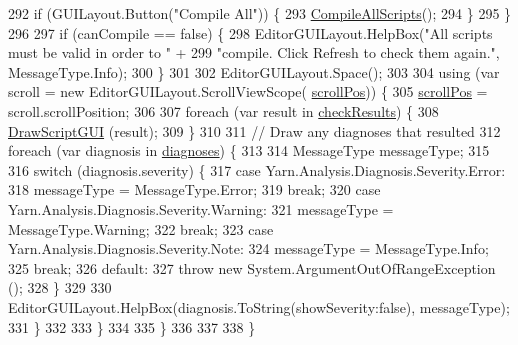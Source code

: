 \begin{DoxyCode}
292                     \textcolor{keywordflow}{if} (GUILayout.Button(\textcolor{stringliteral}{"Compile All"})) \{
293                         \hyperlink{a00188_ab84b77da285227c4ab4e1366131dd2b5}{CompileAllScripts}();
294                     \}
295                 \}
296 
297                 \textcolor{keywordflow}{if} (canCompile == \textcolor{keyword}{false}) \{
298                     EditorGUILayout.HelpBox(\textcolor{stringliteral}{"All scripts must be valid in order to "} +
299                         \textcolor{stringliteral}{"compile. Click Refresh to check them again."}, MessageType.Info);
300                 \}
301 
302                 EditorGUILayout.Space();
303 
304                 \textcolor{keyword}{using} (var scroll = \textcolor{keyword}{new} EditorGUILayout.ScrollViewScope(
      \hyperlink{a00188_a2d9b9702b0980af9d4202aebd440124b}{scrollPos})) \{
305                     \hyperlink{a00188_a2d9b9702b0980af9d4202aebd440124b}{scrollPos} = scroll.scrollPosition;
306 
307                     \textcolor{keywordflow}{foreach} (var result \textcolor{keywordflow}{in} \hyperlink{a00188_aa85ab7bd194e5425b991b9c216d4d10e}{checkResults}) \{
308                         \hyperlink{a00188_a1a7e1a855bb2a9549eb1c0eb292c9b85}{DrawScriptGUI} (result);
309                     \}
310 
311                     \textcolor{comment}{// Draw any diagnoses that resulted}
312                     \textcolor{keywordflow}{foreach} (var diagnosis \textcolor{keywordflow}{in} \hyperlink{a00188_a25c92cbfdd09661a96714d05b14af886}{diagnoses}) \{
313 
314                         MessageType messageType;
315 
316                         \textcolor{keywordflow}{switch} (diagnosis.severity) \{
317                         \textcolor{keywordflow}{case} Yarn.Analysis.Diagnosis.Severity.Error:
318                             messageType = MessageType.Error;
319                             \textcolor{keywordflow}{break};
320                         \textcolor{keywordflow}{case} Yarn.Analysis.Diagnosis.Severity.Warning:
321                             messageType = MessageType.Warning;
322                             \textcolor{keywordflow}{break};
323                         \textcolor{keywordflow}{case} Yarn.Analysis.Diagnosis.Severity.Note:
324                             messageType = MessageType.Info;
325                             \textcolor{keywordflow}{break};
326                         \textcolor{keywordflow}{default}:
327                             \textcolor{keywordflow}{throw} \textcolor{keyword}{new} System.ArgumentOutOfRangeException ();
328                         \}
329 
330                         EditorGUILayout.HelpBox(diagnosis.ToString(showSeverity:\textcolor{keyword}{false}), messageType);
331                     \}
332 
333                 \}
334 
335             \}
336 
337 
338         \}
\end{DoxyCode}
